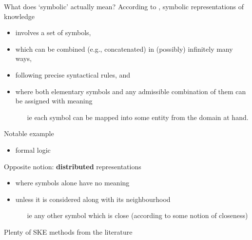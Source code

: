 \documentclass[presentation]{beamer}\mode<presentation>{\usetheme{AMSBolognaFC}}
\begin{document}
\begin{frame}[allowframebreaks]{What does `symbolic' actually mean?}
    According to \cite{Gelder90}, \alert{symbolic} representations of knowledge
    \begin{itemize}
        \item involves a \alert{set of symbols},
        \item which can be combined (e.g., concatenated) in (possibly) \alert{infinitely many} ways, 
        \item following precise \alert{syntactical} rules, and
        \item where both elementary symbols and any admissible combination of them can be assigned with \alert{meaning}
        \begin{itemize}
            \item[ie] \alert{each} symbol can be mapped into some entity from the domain at hand.
        \end{itemize}
    \end{itemize}
    
    \begin{exampleblock}{Notable example}
        \begin{itemize}
            \item formal logic
        \end{itemize}
    \end{exampleblock}

    \framebreak

    \begin{alertblock}{Opposite notion: \textbf{distributed} representations}
        \begin{itemize}
            \item where symbols \alert{alone} have no meaning
            \item unless it is considered along with its \alert{neighbourhood}
            \begin{itemize}
                \item[ie] any other symbol which is \alert{close} (according to some notion of closeness)
            \end{itemize}
        \end{itemize}
    \end{alertblock}
\end{frame}

\begin{frame}[allowframebreaks]{Plenty of SKE methods from the literature}
    
\end{frame}
\end{document}
